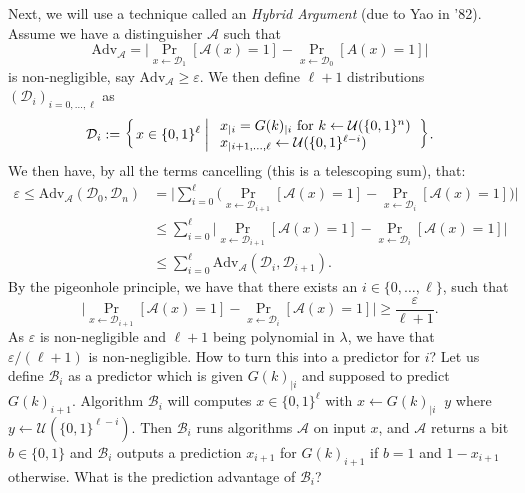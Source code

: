 \documentclass[./main]{subfiles}
\begin{document}
\begin{prv}
    Next, we will use a technique called an \textit{Hybrid Argument} (due to Yao in '82).
    Assume we have a distinguisher $\mathcal{A}$ such that \[
      \mathrm{Adv}_\mathcal{A} = \big| \Pr_{x \gets \mathcal{D}_1}[\mathcal{A}(x) = 1] - \Pr_{x \gets \mathcal{D}_0}[A(x) = 1]\big|
    \]
    is non-negligible, say $\mathrm{Adv}_\mathcal{A} \ge \varepsilon$.
    We then define $\ell + 1$ distributions $(\mathcal{D}_i)_{i = 0, \ldots, \ell}$ as
    \[
    \mathcal{D}_i := \mleft\{\,x \in \{0,1\}^\ell \;\middle|\;
      \begin{array}{l}
        x_{|i} = G(k)_{|i} \text{ for } k \gets \mathcal{U}(\{0,1\}^n)\\
        x_{|i+1, \ldots, \ell} \gets \mathcal{U}(\{0,1\}^{\ell - i})
      \end{array}
    \,\mright\} 
    .\]
    We then have, by all the terms cancelling (this is a telescoping sum), that:
    \begin{align*}
      \varepsilon \le \mathrm{Adv}_\mathcal{A}(\mathcal{D}_0, \mathcal{D}_n)
      &= \Big|\sum_{i = 0}^\ell \big(\Pr_{x \gets \mathcal{D}_{i+1}}[\mathcal{A}(x) = 1] - \Pr_{x \gets \mathcal{D}_i}[\mathcal{A}(x) = 1]\big)\Big| \\
      &\le \sum_{i = 0}^\ell \big|\Pr_{x \gets \mathcal{D}_{i+1}}[\mathcal{A}(x) = 1] - \Pr_{x \gets \mathcal{D}_i}[\mathcal{A}(x) = 1]\big|\\
      &\le \sum_{i= 0}^\ell \mathrm{Adv}_\mathcal{A}(\mathcal{D}_i, \mathcal{D}_{i+1})
    .\end{align*}
    By the pigeonhole principle, we have that there exists an $i \in \{0,\ldots,\ell\}$, such that \[
      \big|\Pr_{x \gets \mathcal{D}_{i+1}}[\mathcal{A}(x) = 1] - \Pr_{x \gets \mathcal{D}_i}[\mathcal{A}(x) = 1] \big| \ge \frac{\varepsilon}{\ell + 1}
    .\] 
    As $\varepsilon$ is non-negligible and  $\ell + 1$ being polynomial in $\lambda$, we have that $\varepsilon / (\ell + 1)$ is non-negligible.
    How to turn this into a predictor for $i$?
    Let us define $\mathcal{B}_i$ as a predictor which is given $G(k)_{|i}$ and supposed to predict $G(k)_{i+1}$.
    Algorithm $\mathcal{B}_i$ will computes $x \in \{0,1\}^\ell$ with $x \gets G(k)_{|i} \mathop{||} y $ where $y \gets \mathcal{U}(\{0,1\}^{\ell-i})$.
    Then $\mathcal{B}_i$ runs algorithms $\mathcal{A}$ on input $x$, and $\mathcal{A}$ returns a bit  $b \in \{0,1\}$ and $\mathcal{B}_i$ outputs a prediction $x_{i+1}$ for $G(k)_{i+1}$ if $b = 1$ and  $1 - x_{i+1}$ otherwise.
    What is the prediction advantage of $\mathcal{B}_i$?
    \begin{align*}

\end{align*}
\end{prv}
\end{document}
